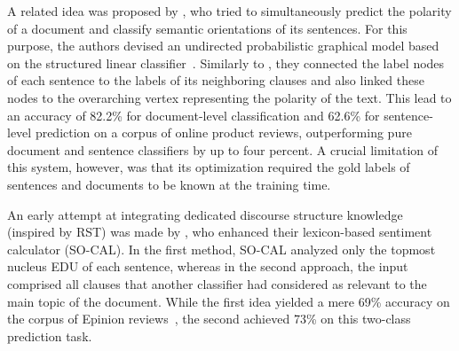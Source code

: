A related idea was proposed by
, who tried to simultaneously predict the polarity
of a document and classify semantic orientations of its sentences.
For this purpose, the authors devised an undirected probabilistic
graphical model based on the structured linear
classifier~\cite{Collins:02}.  Similarly to , they
connected the label nodes of each sentence to the labels of its
neighboring clauses and also linked these nodes to the overarching
vertex representing the polarity of the text.  
This lead to an accuracy of 82.2\% for
document-level classification and 62.6\% for sentence-level prediction
on a corpus of online product reviews, outperforming pure document and
sentence classifiers by up to four percent.  A crucial limitation of
this system, however, was that its optimization required the gold labels
of sentences and documents to be known at the training time.


An early attempt at integrating dedicated discourse structure
knowledge (inspired by RST) was made by , who enhanced
their lexicon-based sentiment calculator (SO-CAL).  In the first
method, SO-CAL analyzed only the topmost nucleus EDU of each sentence,
whereas in the second approach, the input comprised all clauses
that another classifier had considered as relevant to the main topic
of the document.  While the first idea yielded a mere 69\% accuracy on
the corpus of Epinion reviews~\cite{Taboada:06}, the second achieved
73\% on this two-class prediction task.


